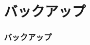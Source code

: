 \documentclass[t,aspectratio=169]{beamer}
\begin{document}
\appendix

\section*{バックアップ}
\begin{frame}
    \frametitle{バックアップ}
    \tableofcontents
\end{frame}







\end{document}
